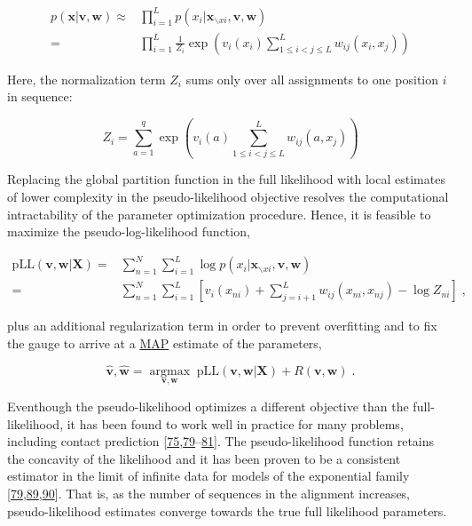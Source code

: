 \documentclass[12pt,a4paper,twoside]{book}
\newcommand{\seq}{\mathbf{x}}
\renewcommand{\v}{\mathbf{v}}
\newcommand{\w}{\mathbf{w}}
\theoremstyle{definition}
\theoremstyle{definition}
\theoremstyle{remark}
\begin{document}
\begin{align}
  p(\seq | \v,\w) \approx&   \prod_{i=1}^L p(x_i | \seq_{\backslash xi}, \v,\w) \nonumber \\
                        =&  \prod_{i=1}^L \frac{1}{Z_i} \exp \left(  v_i(x_i) \sum_{1 \leq i < j \leq L}^L w_{ij}(x_i, x_j) \right)
\end{align}

Here, the normalization term \(Z_i\) sums only over all assignments to
one position \(i\) in sequence:

\begin{equation}
  Z_i = \sum_{a=1}^{q} \exp \left( v_i(a) \sum_{1 \leq i < j \leq L}^L w_{ij}(a, x_j) \right)
\label{eq:partition-fct-pll}
\end{equation}

Replacing the global partition function in the full likelihood with
local estimates of lower complexity in the pseudo-likelihood objective
resolves the computational intractability of the parameter optimization
procedure. Hence, it is feasible to maximize the pseudo-log-likelihood
function,

\begin{align}
    \text{pLL}(\v, \w | \mathbf{X}) =& \sum_{n=1}^N \sum_{i=1}^L \log p(x_i | \seq_{\backslash xi}, \v,\w) \nonumber \\
    =& \sum_{n=1}^N \sum_{i=1}^L  \left[ v_i(x_{ni}) + \sum_{j=i+1}^L  w_{ij}(x_{ni}, x_{nj}) - \log Z_{ni} \right] \;,
\end{align}

plus an additional regularization term in order to prevent overfitting
and to fix the gauge to arrive at a \protect\hyperlink{abbrev}{MAP}
estimate of the parameters,

\begin{equation}
    \hat{\v}, \hat{\w} = \underset{\v, \w}{\operatorname{argmax}} \; \text{pLL}(\v, \w | \mathbf{X}) + R(\v, \w) \; .
\end{equation}

Eventhough the pseudo-likelihood optimizes a different objective than
the full-likelihood, it has been found to work well in practice for many
problems, including contact prediction
{[}\protect\hyperlink{ref-Murphy2012}{75},\protect\hyperlink{ref-Koller2009}{79}--\protect\hyperlink{ref-Stein2015a}{81}{]}.
The pseudo-likelihood function retains the concavity of the likelihood
and it has been proven to be a consistent estimator in the limit of
infinite data for models of the exponential family
{[}\protect\hyperlink{ref-Koller2009}{79},\protect\hyperlink{ref-Besag1975}{89},\protect\hyperlink{ref-Gidas1988}{90}{]}.
That is, as the number of sequences in the alignment increases,
pseudo-likelihood estimates converge towards the true full likelihood
parameters.
\end{document}
